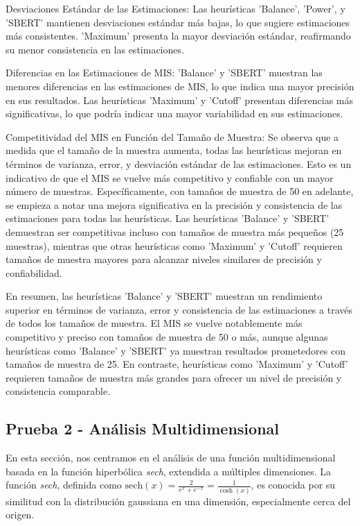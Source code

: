 \documentclass{article}
\begin{document}
Desviaciones Estándar de las Estimaciones: Las heurísticas 'Balance', 'Power', y 'SBERT' mantienen desviaciones estándar más bajas, lo que sugiere estimaciones más consistentes.
'Maximum' presenta la mayor desviación estándar, reafirmando su menor consistencia en las estimaciones.

Diferencias en las Estimaciones de MIS: 'Balance' y 'SBERT' muestran las menores diferencias en las estimaciones de MIS, lo que indica una mayor precisión en sus resultados.
Las heurísticas 'Maximum' y 'Cutoff' presentan diferencias más significativas, lo que podría indicar una mayor variabilidad en sus estimaciones.

Competitividad del MIS en Función del Tamaño de Muestra: Se observa que a medida que el tamaño de la muestra aumenta, todas las heurísticas mejoran en términos de varianza, error, y desviación estándar de las estimaciones. Esto es un indicativo de que el MIS se vuelve más competitivo y confiable con un mayor número de muestras.
Específicamente, con tamaños de muestra de 50 en adelante, se empieza a notar una mejora significativa en la precisión y consistencia de las estimaciones para todas las heurísticas.
Las heurísticas 'Balance' y 'SBERT' demuestran ser competitivas incluso con tamaños de muestra más pequeños (25 muestras), mientras que otras heurísticas como 'Maximum' y 'Cutoff' requieren tamaños de muestra mayores para alcanzar niveles similares de precisión y confiabilidad.

En resumen, las heurísticas 'Balance' y 'SBERT' muestran un rendimiento superior en términos de varianza, error y consistencia de las estimaciones a través de todos los tamaños de muestra. El MIS se vuelve notablemente más competitivo y preciso con tamaños de muestra de 50 o más, aunque algunas heurísticas como 'Balance' y 'SBERT' ya muestran resultados prometedores con tamaños de muestra de 25. En contraste, heurísticas como 'Maximum' y 'Cutoff' requieren tamaños de muestra más grandes para ofrecer un nivel de precisión y consistencia comparable.

\subsection{Prueba 2 - Análisis Multidimensional}

En esta sección, nos centramos en el análisis de una función multidimensional basada en la función hiperbólica \textit{sech}, extendida a múltiples dimensiones. La función \textit{sech}, definida como \( \text{sech}(x) = \frac{2}{e^x + e^{-x}} = \frac{1}{\cosh(x)} \), es conocida por su similitud con la distribución gaussiana en una dimensión, especialmente cerca del origen.
\end{document}
